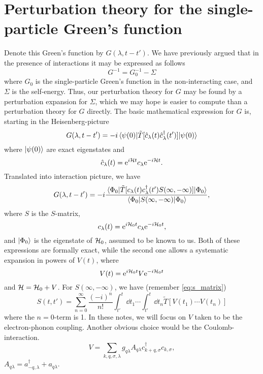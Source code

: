 \section[Single particle Green's function]{Perturbation theory for the single-particle Green's function}
Denote this Green's function by $G(\lambda, t-t')$. We have previously argued that in the presence of interactions it may be expressed as follows
\begin{equation} 
G^{-1} = G_0^{-1} - \Sigma
\end{equation}
where $G_0$ is the single-particle Green's function in the non-interacting case, and $\Sigma$ is the self-energy. Thus, our perturbation theory for $G$ may be found by a perturbation expansion for $\Sigma$, which we may hope is easier to compute than a perturbation theory for $G$ directly. The basic mathematical expression for $G$ is, starting in the Heisenberg-picture
\begin{equation} 
G(\lambda, t-t') = -i\ev{\tilde{T}[\hat{c}_\lambda(t)\hat{c}_\lambda^\dagger(t')]}{\psi(0)}
\end{equation}
where $\ket{\psi(0)}$ are exact eigenstates and 
\begin{equation} 
\hat{c}_\lambda(t) = \mathrm{e}^{i\mathcal{H} t}c_\lambda\mathrm{e}^{-i\mathcal{H} t}.
\end{equation}
Translated into interaction picture, we have
\begin{equation} 
G(\lambda, t-t') = -i\frac{\ev{\tilde{T}[{c}_{\lambda}(t){c}_{\lambda}^\dagger(t')S(\infty, -\infty)]}{\Phi_0}}{\ev{S(\infty, -\infty)}{\Phi_0}},
\end{equation}
where $S$ is the $S$-matrix,
\begin{equation} 
c_\lambda(t) = \mathrm{e}^{i\mathcal{H}_0 t}c_\lambda\mathrm{e}^{-i\mathcal{H}_0 t},
\end{equation}
and $\ket{\Phi_0}$  is the eigenstate of $\mathcal{H}_0$, assumed to be known to us. 
Both of these expressions are formally exact, while the second one allows a systematic expansion in powers of $V(t)$, where
\begin{equation} 
V(t) = \mathrm{e}^{i\mathcal{H}_0 t}V\mathrm{e}^{-i\mathcal{H}_0 t}
\end{equation}
and $\mathcal{H} = \mathcal{H}_0 + V$.
For $S(\infty, -\infty)$, we have (remember \cref{eq:s_matrix})
\begin{equation} 
S(t, t') =  \sum_{n=0}^{\infty}\frac{(-i)^n}{n!}\int_{t'}^{t}\dd{t_1}\cdots\int_{t'}^{t}\dd{t_n}\tilde{T}[V(t_1)\cdots V(t_n)]
\end{equation}
where the $n=0$-term is 1. 
In these notes, we will focus on $V$ taken to be the electron-phonon coupling. Another obvious choice would be the Coulomb-interaction. 
\begin{equation}
\label{eq:el_ph}
V =\sum_{k,q, \sigma, \lambda}g_{q\lambda}A_{q\lambda} c_{k+q,\sigma}^\dagger c_{k,\sigma},
\end{equation}
$A_{q\lambda} = a_{-q,\lambda}^\dagger + a_{q\lambda}$.

